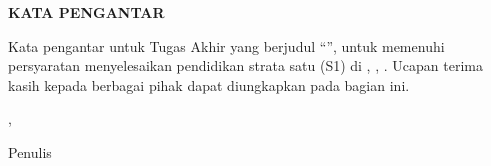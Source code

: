 
\begin{center}
    {\textbf{KATA PENGANTAR}}
    \pagestyle{fancy}
\end{center}

Kata pengantar untuk Tugas Akhir yang berjudul “{\MakeUppercase{\textbf{\judulTA}}}”, untuk memenuhi persyaratan menyelesaikan pendidikan strata satu (S1) di \namaDepartemen, \namaFakultas, \namaUniversitas. Ucapan terima kasih kepada berbagai pihak dapat diungkapkan pada bagian ini. 

\vspace{6mm}

\begin{flushright}

\namaKota, \tanggalPengesahan

\vspace{6mm}

Penulis

\end{flushright}

\newpage